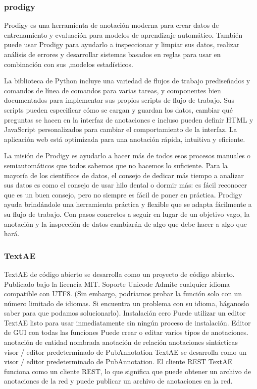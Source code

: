 \subsubsection*{prodigy}

Prodigy es una herramienta de anotación moderna para crear datos de entrenamiento y evaluación para modelos de aprendizaje automático. También puede usar Prodigy para ayudarlo a inspeccionar y limpiar sus datos, realizar análisis de errores y desarrollar sistemas basados en reglas para usar en combinación con sus ,modelos estadísticos.

La biblioteca de Python incluye una variedad de flujos de trabajo prediseñados y comandos de línea de comandos para varias tareas, y componentes bien documentados para implementar sus propios scripts de flujo de trabajo. Sus scripts pueden especificar cómo se cargan y guardan los datos, cambiar qué preguntas se hacen en la interfaz de anotaciones e incluso pueden definir HTML y JavaScript personalizados para cambiar el comportamiento de la interfaz. La aplicación web está optimizada para una anotación rápida, intuitiva y eficiente.

La misión de Prodigy es ayudarlo a hacer más de todos esos procesos manuales o semiautomáticos que todos sabemos que no hacemos lo suficiente. Para la mayoría de los científicos de datos, el consejo de dedicar más tiempo a analizar sus datos es como el consejo de usar hilo dental o dormir más: es fácil reconocer que es un buen consejo, pero no siempre es fácil de poner en práctica. Prodigy ayuda brindándole una herramienta práctica y flexible que se adapta fácilmente a su flujo de trabajo. Con pasos concretos a seguir en lugar de un objetivo vago, la anotación y la inspección de datos cambiarán de algo que debe hacer a algo que hará.

\subsubsection*{TextAE}

TextAE de código abierto se desarrolla como un proyecto de código abierto. Publicado bajo la licencia MIT. Soporte Unicode Admite cualquier idioma compatible con UTF8. (Sin embargo, podríamos probar la función solo con un número limitado de idiomas. Si encuentra un problema con su idioma, háganoslo saber para que podamos solucionarlo). Instalación cero
Puede utilizar un editor TextAE listo para usar inmediatamente sin ningún proceso de instalación.
Editor de GUI con todas las funciones
Puede crear o editar varios tipos de anotaciones. anotación de entidad nombrada anotación de relación anotaciones sintácticas visor / editor predeterminado de PubAnnotation TextAE se desarrolla como un visor / editor predeterminado de PubAnnotation.
El cliente REST TextAE funciona como un cliente REST, lo que significa que puede obtener un archivo de anotaciones de la red y puede publicar un archivo de anotaciones en la red.

